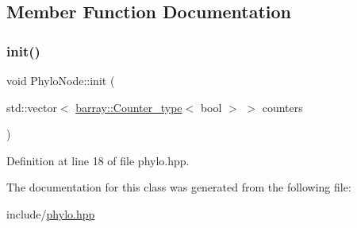 \subsection{Member Function Documentation}
\mbox{\label{class_phylo_node_a4f0a519f46010f53fb776cc7f8b992c1}} 
\subsubsection{\texorpdfstring{init()}{init()}}
{\footnotesize\ttfamily void Phylo\+Node\+::init (\begin{DoxyParamCaption}\item[{std\+::vector$<$ \hyperlink{namespacebarray_a4e53ad306ef79910e07db94c29ec4f0e}{barray\+::\+Counter\+\_\+type}$<$ bool $>$ $>$}]{counters }\end{DoxyParamCaption})\hspace{0.3cm}{\ttfamily [inline]}}



Definition at line 18 of file phylo.\+hpp.



The documentation for this class was generated from the following file\+:\begin{DoxyCompactItemize}
\item 
include/\hyperlink{phylo_8hpp}{phylo.\+hpp}\end{DoxyCompactItemize}
